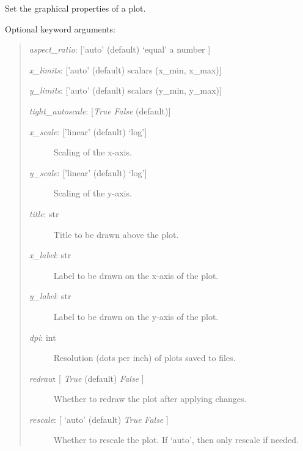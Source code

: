 \documentclass[letterpaper,10pt,english]{sphinxmanual}
\begin{document}
\begin{fulllineitems}
\begin{fulllineitems}
\begin{quote}
\begin{description}
\end{description}
\end{quote}

\end{fulllineitems}


\begin{fulllineitems}
\label{api:mpl.Plot2D.set_plot_properties}
Set the graphical properties of a plot.

Optional keyword arguments:
\begin{quote}

\emph{aspect\_ratio}: {[}'auto' (default) \textbar{} `equal' \textbar{} a number {]}

\emph{x\_limits}: {[}'auto' (default) \textbar{} scalars (x\_min, x\_max){]}

\emph{y\_limits}: {[}'auto' (default) \textbar{} scalars (y\_min, y\_max){]}

\emph{tight\_autoscale}: {[}\emph{True} \textbar{} \emph{False} (default){]}
\begin{description}
\item[{\emph{x\_scale}: {[}'linear' (default) \textbar{} `log'{]}}] \leavevmode
Scaling of the x-axis.

\item[{\emph{y\_scale}: {[}'linear' (default) \textbar{} `log'{]}}] \leavevmode
Scaling of the y-axis.

\item[{\emph{title}: str}] \leavevmode
Title to be drawn above the plot.

\item[{\emph{x\_label}: str}] \leavevmode
Label to be drawn on the x-axis of the plot.

\item[{\emph{y\_label}: str}] \leavevmode
Label to be drawn on the y-axis of the plot.

\item[{\emph{dpi}: int}] \leavevmode
Resolution (dots per inch) of plots saved to files.

\item[{\emph{redraw}: {[} \emph{True}  (default) \textbar{} \emph{False} {]}}] \leavevmode
Whether to redraw the plot after applying changes.

\item[{\emph{rescale}: {[} `auto' (default) \textbar{} \emph{True} \textbar{} \emph{False} {]}}] \leavevmode
Whether to rescale the plot. If `auto', then only rescale if needed.


\end{description}
\end{quote}
\end{fulllineitems}
\end{fulllineitems}
\end{document}
